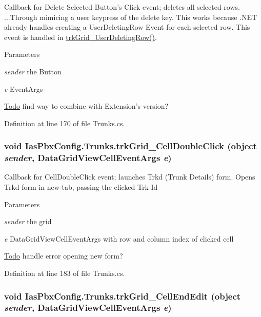 Callback for Delete Selected Button's Click event; deletes all selected rows. ...Through mimicing a user keypress of the delete key. This works because .NET already handles creating a UserDeletingRow Event for each selected row. This event is handled in \hyperlink{class_ias_pbx_config_1_1_trunks_a707a8fb3145ec2a85fccff41d1057532}{trkGrid\_\-UserDeletingRow()}. 
\begin{DoxyParams}{Parameters}
\item[{\em sender}]the Button \item[{\em e}]EventArgs \end{DoxyParams}
\begin{Desc}
\item[\hyperlink{todo__todo000054}{Todo}]find way to combine with Extension's version? \end{Desc}


Definition at line 170 of file Trunks.cs.\hypertarget{class_ias_pbx_config_1_1_trunks_a040a120f3c938eef87f022132d28185b}{
\subsubsection[{trkGrid\_\-CellDoubleClick}]{\setlength{\rightskip}{0pt plus 5cm}void IasPbxConfig.Trunks.trkGrid\_\-CellDoubleClick (object {\em sender}, \/  DataGridViewCellEventArgs {\em e})}}
\label{class_ias_pbx_config_1_1_trunks_a040a120f3c938eef87f022132d28185b}


Callback for CellDoubleClick event; launches Trkd (Trunk Details) form. Opens Trkd form in new tab, passing the clicked Trk Id 
\begin{DoxyParams}{Parameters}
\item[{\em sender}]the grid \item[{\em e}]DataGridViewCellEventArgs with row and column index of clicked cell \end{DoxyParams}
\begin{Desc}
\item[\hyperlink{todo__todo000055}{Todo}]handle error opening new form? \end{Desc}


Definition at line 183 of file Trunks.cs.\hypertarget{class_ias_pbx_config_1_1_trunks_a991c7f28f689229614bd13673f9a9fe9}{
\subsubsection[{trkGrid\_\-CellEndEdit}]{\setlength{\rightskip}{0pt plus 5cm}void IasPbxConfig.Trunks.trkGrid\_\-CellEndEdit (object {\em sender}, \/  DataGridViewCellEventArgs {\em e})}}
\label{class_ias_pbx_config_1_1_trunks_a991c7f28f689229614bd13673f9a9fe9}



